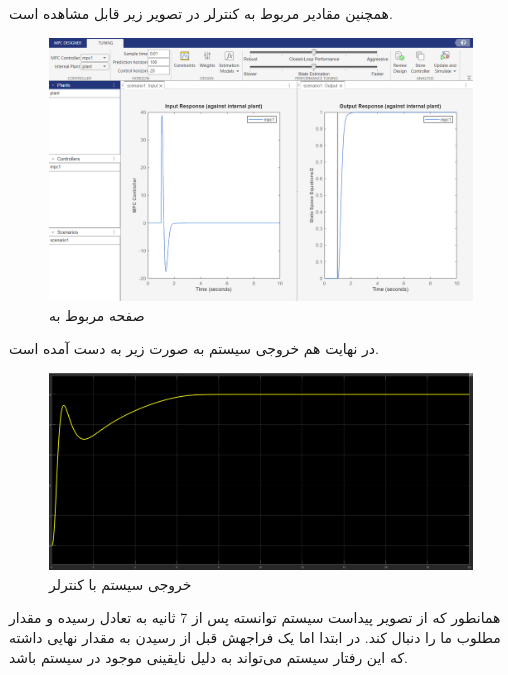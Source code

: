 \documentclass[14pt, a4paper]{extarticle}
\begin{document}
همچنین مقادیر مربوط به کنترلر در تصویر زیر قابل مشاهده است.\\

\begin{figure}[h!]
	\centering
	\includegraphics[scale = 0.5]{Q1_2_mpc.png}
	\caption{صفحه مربوط به 
		}
\end{figure}
\newpage
در نهایت هم خروجی سیستم به صورت زیر به دست آمده است.
\begin{figure}[h!]
	\centering
	\includegraphics[scale = 0.4]{Q1_2_result.png}
	\caption{خروجی سیستم با کنترلر 
		}
\end{figure}

همانطور که از تصویر پیداست سیستم توانسته پس از 7 ثانیه به تعادل رسیده و مقدار مطلوب ما را دنبال کند. در ابتدا اما یک فراجهش قبل از رسیدن به مقدار نهایی داشته که این رفتار سیستم می‌تواند به دلیل نایقینی موجود در سیستم باشد.
\newpage
\end{document}
